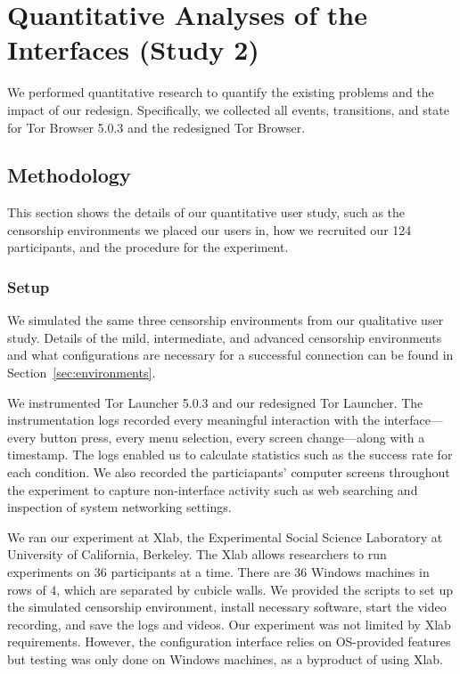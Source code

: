 \documentclass[USenglish,oneside,twocolumn]{article}
\begin{document}
\section{Quantitative Analyses of the Interfaces (Study 2)}
\label{sec:quantitative}
We performed quantitative research to quantify the existing problems
and the impact of our redesign. Specifically, we collected all events, transitions, 
and state for Tor Browser 5.0.3 and the redesigned Tor Browser.

\subsection{Methodology} 
This section shows the details of our quantitative user study, such as the censorship environments we placed our users in, how we recruited our 124 participants, and the procedure for the experiment. 

\subsubsection{Setup}
We simulated the same three censorship environments from 
our qualitative user study. Details of the mild, intermediate, and advanced 
censorship environments and what configurations are necessary for a 
successful connection can be found in Section~\ref{sec:environments}.

We instrumented Tor Launcher 5.0.3 and our redesigned Tor Launcher.
The instrumentation logs recorded every meaningful interaction with the interface---every
button press, every menu selection, every screen change---along with a timestamp.
The logs enabled us to calculate statistics such as the success rate
for each condition. We also recorded the particiapants' computer screens 
throughout the experiment to capture non-interface activity such as 
web searching and inspection of system networking settings.

We ran our experiment at Xlab, the Experimental Social Science Laboratory at University of 
California, Berkeley. The Xlab allows researchers to run experiments on 36 participants at a time.
There are 36 Windows machines in rows of 4, which are separated by cubicle walls. 
We provided the scripts to set up the simulated censorship environment, install necessary software, 
start the video recording, and save the logs and videos. Our experiment was not limited by Xlab
requirements. However, the configuration interface relies on OS-provided features but testing 
was only done on Windows machines, as a byproduct of using Xlab. 
\end{document}
